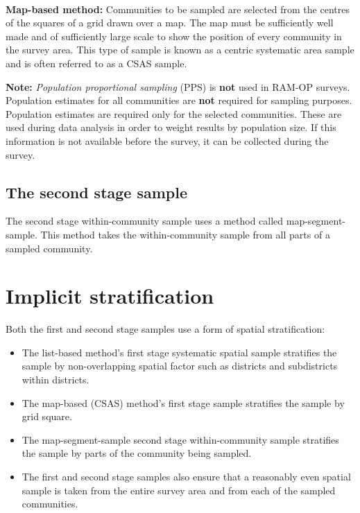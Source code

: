 \documentclass[12pt,]{book}
\theoremstyle{definition}
\theoremstyle{definition}
\theoremstyle{definition}
\theoremstyle{remark}
\begin{document}
~

\textbf{Map-based method:} Communities to be sampled are selected from
the centres of the squares of a grid drawn over a map. The map must be
sufficiently well made and of sufficiently large scale to show the
position of every community in the survey area. This type of sample is
known as a centric systematic area sample and is often referred to as a
CSAS sample.

\textbf{Note:} \emph{Population proportional sampling} (PPS) is
\textbf{not} used in RAM-OP surveys. Population estimates for all
communities are \textbf{not} required for sampling purposes. Population
estimates are required only for the selected communities. These are used
during data analysis in order to weight results by population size. If
this information is not available before the survey, it can be collected
during the survey.

\hypertarget{the-second-stage-sample}{%
\subsection{The second stage sample}\label{the-second-stage-sample}}

The second stage within-community sample uses a method called
map-segment-sample. This method takes the within-community sample from
all parts of a sampled community.

\hypertarget{implicit-stratification}{%
\section{Implicit stratification}\label{implicit-stratification}}

Both the first and second stage samples use a form of spatial
stratification:

\begin{itemize}
\item
  The list-based method's first stage systematic spatial sample
  stratifies the sample by non-overlapping spatial factor such as
  districts and subdistricts within districts.
\item
  The map-based (CSAS) method's first stage sample stratifies the sample
  by grid square.
\item
  The map-segment-sample second stage within-community sample stratifies
  the sample by parts of the community being sampled.
\item
  The first and second stage samples also ensure that a reasonably even
  spatial sample is taken from the entire survey area and from each of
  the sampled communities.
\end{itemize}
\end{document}

